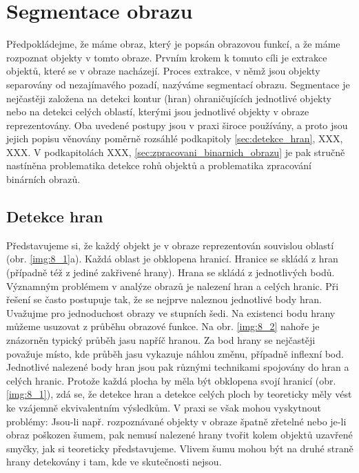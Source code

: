 \chapter*{Segmentace obrazu} \label{sec:segmentace_obrazu}

Předpokládejme, že máme obraz, který je popsán obrazovou funkcí, a že máme rozpoznat objekty v tomto obraze. Prvním krokem k tomuto cíli je extrakce objektů, které se v obraze nacházejí. Proces extrakce, v němž jsou objekty separovány od nezajímavého pozadí, nazýváme segmentací obrazu. Segmentace je nejčastěji založena na detekci kontur (hran) ohraničujících jednotlivé objekty nebo na detekci celých oblastí, kterými jsou jednotlivé objekty v obraze reprezentovány. Oba uvedené postupy jsou v praxi široce používány, a proto jsou jejich popisu věnovány poměrně rozsáhlé podkapitoly \ref{sec:detekce_hran}, XXX, XXX. V podkapitolách XXX, \ref{sec:zpracovani_binarnich_obrazu} je pak stručně nastíněna problematika detekce rohů objektů a problematika zpracování binárních obrazů.

\section*{Detekce hran} \label{sec:detekce_hran}

Představujeme si, že každý objekt je v obraze reprezentován souvislou oblastí (obr. \ref{img:8_1}a). Každá oblast je obklopena hranicí. Hranice se skládá z hran (případně též z jediné zakřivené hrany). Hrana se skládá z jednotlivých bodů. Významným problémem v analýze obrazů je nalezení hran a celých hranic. Při řešení se často postupuje tak, že se nejprve naleznou jednotlivé body hran. Uvažujme pro jednoduchost obrazy ve stupních šedi. Na existenci bodu hrany můžeme usuzovat z průběhu obrazové funkce. Na obr. \ref{img:8_2} nahoře je znázorněn typický průběh jasu napříč hranou. Za bod hrany se nejčastěji považuje místo, kde průběh jasu vykazuje náhlou změnu, případně inflexní bod. Jednotlivé nalezené body hran jsou pak různými technikami spojovány do hran a celých hranic. Protože každá plocha by měla být obklopena svojí hranicí (obr. \ref{img:8_1}), zdá se, že detekce hran a detekce celých ploch by teoreticky měly vést ke vzájemně ekvivalentním výsledkům. V praxi se však mohou vyskytnout problémy: Jsou-li např. rozpoznávané objekty v obraze špatně zřetelné nebo je-li obraz poškozen šumem, pak nemusí nalezené hrany tvořit kolem objektů uzavřené smyčky, jak si teoreticky představujeme. Vlivem šumu mohou být na druhé straně hrany detekovány i tam, kde ve skutečnosti nejsou.

